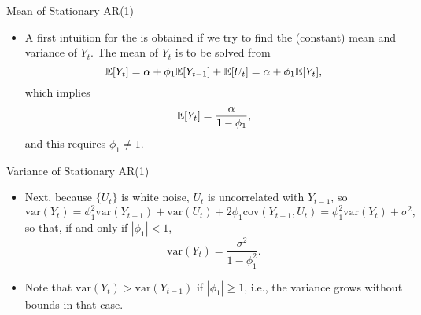 \begin{frame}{Mean  of Stationary AR(1)}
\begin{itemize}

\item A first intuition for the  is obtained if we try to
find the (constant) mean and variance of $Y_t$.
 The mean of $Y_t$ is to be solved from
\begin{equation*}
{\mathbb E}[Y_t] = \alpha + \phi_1 {\mathbb E}[Y_{t-1}] + {\mathbb E}[U_t] = \alpha + \phi_1 {\mathbb E}[Y_{t}],
\end{equation*}
which implies
\begin{equation*}
{\mathbb E}[Y_t] = \frac{\alpha}{1-\phi_1},
\end{equation*}
and this requires $\phi_1 \ne 1$.
\end{itemize}
\end{frame}
\begin{frame}{Variance of Stationary AR(1)}
\begin{itemize}
\item Next, because $\{U_t\}$ is white noise, $U_t$  is uncorrelated with $Y_{t-1}$, so
\begin{equation*}
\mathrm{var}(Y_t) = \phi_1^2 \mathrm{var}(Y_{t-1}) + \mathrm{var}(U_t) + 2
\phi_1 \mathrm{cov}(Y_{t-1},U_{t}) = \phi_1^2 \mathrm{var}(Y_{t}) +
\sigma^2,
\end{equation*}
so that, if and only if $|\phi_1 |<1$,
\begin{equation*}
\mathrm{var}(Y_t) = \frac{\sigma^2}{1-\phi_1^2}.
\end{equation*}

\item Note that $\mathrm{var}(Y_t) > \mathrm{var}(Y_{t-1})$ if $|\phi_1 |\ge 1$, i.e., the variance grows without bounds in that case.
\end{itemize}
\end{frame}



